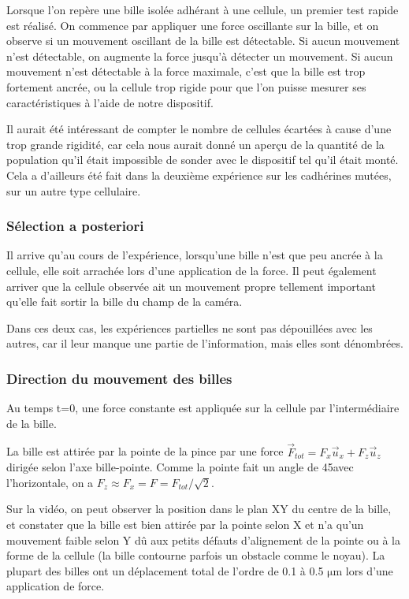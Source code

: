 \documentclass{report}
\newcommand{\micro}{$\mathrm{\mu}$}
\begin{document}
Lorsque l'on repère une bille isolée adhérant à une cellule, un premier test rapide est réalisé.
On commence par appliquer une force oscillante sur la bille, et on observe si un mouvement oscillant de la bille est détectable. Si aucun mouvement n'est détectable, on augmente la force jusqu'à détecter un mouvement. Si aucun mouvement n'est détectable à la force maximale, c'est que la bille est trop fortement ancrée, ou la cellule trop rigide pour que l'on puisse mesurer ses caractéristiques à l'aide de notre dispositif. 

Il aurait été intéressant de compter le nombre de cellules écartées à cause d'une trop grande rigidité, car cela nous aurait donné un aperçu de la quantité de la population qu'il était impossible de sonder avec le dispositif tel qu'il était monté. Cela a d'ailleurs été fait dans la deuxième expérience sur les cadhérines mutées, sur un autre type cellulaire. 

\subsubsection{Sélection a posteriori}

Il arrive qu'au cours de l'expérience, lorsqu'une bille n'est que peu ancrée à la cellule, elle soit arrachée lors d'une application de la force.
Il peut également arriver que la cellule observée ait un mouvement propre tellement important qu'elle fait sortir la bille du  champ de la caméra. 

Dans ces deux cas, les expériences partielles ne sont pas dépouillées avec les autres, car il leur manque une partie de l'information, mais elles sont dénombrées.



\subsubsection{Direction du mouvement des billes}
Au temps t=0, une force constante est appliquée sur la cellule par l'intermédiaire de la bille. 

La bille est attirée par la pointe de la pince par une force $\vec{F}_{tot}=F_x \vec{u}_x+F_z \vec{u}_z$ dirigée selon l'axe bille-pointe. Comme la pointe fait un angle de 45\degres  avec l'horizontale, on a $F_z \approx F_x = F = F_{tot} / \sqrt{2} $. 

Sur la vidéo, on peut observer la position dans le plan XY du centre de la bille, et constater que la bille est bien attirée par la pointe selon X et n'a qu'un mouvement faible selon Y dû aux petits défauts d'alignement de la pointe ou à la forme de la cellule (la bille contourne parfois un obstacle comme le noyau). La plupart des billes ont un déplacement total de l'ordre de 0.1 à 0.5 \micro m lors d'une application de force. 
\end{document}
